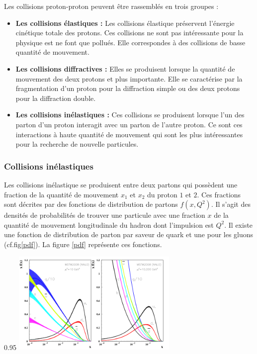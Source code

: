 Les collisions proton-proton peuvent être rassemblés en trois groupes :
\begin{itemize}[label=$\bullet$]
	\item \textbf{Les collisions élastiques : } Les collisions élastique préservent l'énergie cinétique totale des protons. Ces collisions ne sont pas intéressante pour la physique est ne font que pollués. Elle correspondes à des collisions de basse quantité de mouvement.
	\item\textbf{Les collisions diffractives : } Elles se produisent lorsque la quantité de mouvement des deux protons et plus importante. Elle se caractérise par la fragmentation d'un proton pour la diffraction simple ou des deux protons pour la diffraction double.
	\item \textbf{Les collisions inélastiques : } Ces collisions se produisent lorsque l'un des parton d'un proton interagit avec un parton de l'autre proton. Ce sont ces interactions à haute quantité de mouvement qui sont les plus intéressantes pour la recherche de nouvelle particules.
\end{itemize}

\subsubsection{Collisions inélastiques}
Les collisions inélastique se produisent entre deux partons qui possèdent une fraction de la quantité de mouvement $x_{1}$ et $x_{2}$ du proton $1$ et $2$. Ces fractions sont décrites par des fonctions de distribution de partons $f(x,Q^{2})$. Il s'agit des densités de probabilités de trouver une particule avec une fraction $x$ de la quantité de mouvement longitudinale du hadron dont l'impulsion est $Q^{2}$. Il existe une fonction de distribution de parton par saveur de quark et une pour les gluons (cf.fig\ref{pdf}). La figure \ref{pdf} représente ces fonctions.

\begin{minipagewithmarginpars}[h]{0.95\textwidth}
	\centering
	\includegraphics[width=0.6\textwidth]{LHC/pdf.png}
	\label{pdf}	
\end{minipagewithmarginpars}
 
